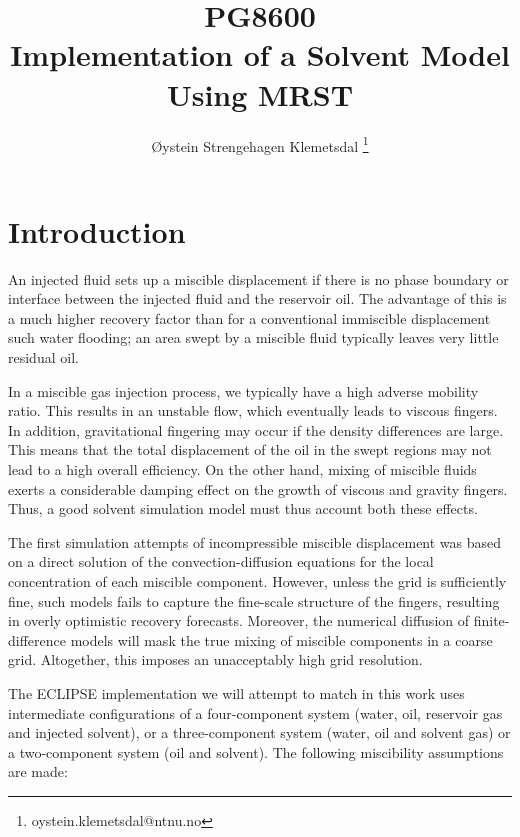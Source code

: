 \documentclass[11pt, a4paper]{article}
\title{\bfseries \textcolor{ntnuBlue}{PG8600 \\ \vspace{5pt} \Huge{Implementation of a Solvent Model Using MRST}}}
\author{Øystein Strengehagen Klemetsdal
  \thanks{oystein.klemetsdal@ntnu.no}}
\begin{document}
\maketitle

\begin{abstract}

\end{abstract}

\section{Introduction}

An injected fluid sets up a miscible displacement if there is no phase boundary or interface between
the injected fluid and the reservoir oil. The advantage of this is a much higher recovery factor
than for a conventional immiscible displacement such water flooding; an area swept by a miscible
fluid typically leaves very little residual oil.

In a miscible gas injection process, we typically have a high adverse mobility ratio. This results
in an unstable flow, which eventually leads to viscous fingers. In addition, gravitational fingering
may occur if the density differences are large. This means that the total displacement of the oil in
the swept regions may not lead to a high overall efficiency. On the other hand, mixing of miscible
fluids exerts a considerable damping effect on the growth of viscous and gravity fingers. Thus, a
good solvent simulation model must thus account both these effects.

The first simulation attempts of incompressible miscible displacement was based on a direct solution
of the convection-diffusion equations for the local concentration of each miscible
component. However, unless the grid is sufficiently fine, such models fails to capture the
fine-scale structure of the fingers, resulting in overly optimistic recovery forecasts. Moreover,
the numerical diffusion of finite-difference models will mask the true mixing of miscible components
in a coarse grid. Altogether, this imposes an unacceptably high grid resolution.

The ECLIPSE implementation we will attempt to match in this work uses intermediate configurations of
a four-component system (water, oil, reservoir gas and injected solvent), or a three-component
system (water, oil and solvent gas) or a two-component system (oil and solvent). The following
miscibility assumptions are made:
\end{document}
